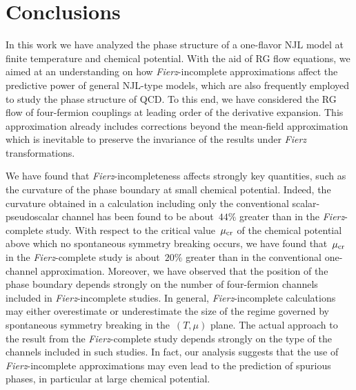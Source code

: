 \documentclass[prd,english,preprintnumbers,amsmath,amssymb,nofootinbib,twocolumn,superscriptaddress]{revtex4-1}
\begin{document}
{{%
\section{Conclusions}\label{sec:conc}
%
In this work we have analyzed the phase structure of a one-flavor NJL model at finite temperature 
and chemical potential. With the aid of RG flow equations, we aimed at an understanding on how
{\it Fierz}-incomplete approximations affect the predictive power of general NJL-type models, which are also 
frequently employed to study the phase structure of QCD.
To this end, we have considered the RG flow of four-fermion couplings at leading order 
of the derivative expansion. This approximation
already includes corrections beyond the mean-field approximation which is inevitable to preserve the invariance
of the results under {\it Fierz} transformations. 

We have found {that {\it Fierz}-incompleteness affects strongly} key quantities, such as the curvature of the phase boundary
at small chemical potential. Indeed, the curvature obtained in a calculation including only the conventional scalar-pseudoscalar 
channel has been found to {be about~$44\%$ greater} than in the {\it Fierz}-complete study. With respect to the 
critical value~$\mu_{\rm cr}$ 
of the chemical potential above which no spontaneous symmetry breaking occurs, we have found that~$\mu_{\rm cr}$ in 
the {\it Fierz}-complete study is about~$20\%$ greater than in the conventional one-channel approximation.
Moreover, we have observed
that the position of the phase boundary depends strongly on the number of four-fermion channels 
included in {\it Fierz}-incomplete studies.
In general, {\it Fierz}-incomplete calculations may either
overestimate or underestimate the size of the regime governed by spontaneous symmetry breaking
in the~$(T,\mu)$ plane. 
The actual approach to the result from the {\it Fierz}-complete
study depends strongly on the type of the channels included in such studies.
In fact,
our analysis suggests that
the use of {\it Fierz}-incomplete approximations may even lead to the prediction of spurious phases, in particular at large chemical
potential.

}}
\end{document}
